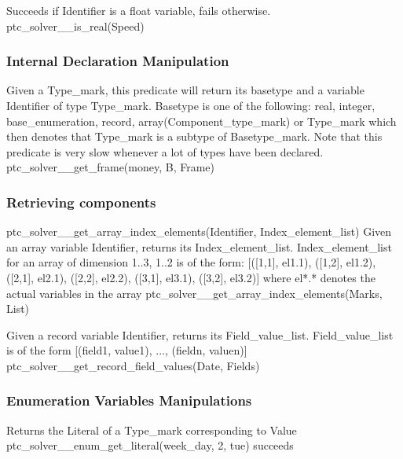 \documentclass{article}
\begin{document}
    {Succeeds if Identifier is a float variable, fails otherwise.}
    {ptc\_solver\_\_is\_real(Speed)}
    {}

\subsubsection{Internal Declaration Manipulation}

\hspace{\parindent}
{Given a Type\_mark, this predicate will return its basetype and a
variable Identifier of type Type\_mark. Basetype is one of the following: real,
integer, base\_enumeration, record,
array(Component\_type\_mark) or Type\_mark which then denotes that Type\_mark is
a subtype of Basetype\_mark. Note that this predicate is very slow whenever a lot
of types have been declared.}
{ptc\_solver\_\_get\_frame(money, B, Frame)}
{}

\subsubsection{Retrieving components}

\hspace{\parindent}\pro
{ptc\_solver\_\_get\_array\_index\_elements(Identifier, Index\_element\_list)}
    {Given an array variable Identifier, returns its Index\_element\_list.
Index\_element\_list for an array of dimension 1..3, 1..2 is of the form:
 [([1,1], el1.1), ([1,2], el1.2), ([2,1], el2.1), ([2,2], el2.2), ([3,1], el3.1),
([3,2],
 el3.2)] where el*.* denotes the actual variables in the array}
        {ptc\_solver\_\_get\_array\_index\_elements(Marks, List)}
        {}

    {Given a record variable Identifier, returns its Field\_value\_list.
Field\_value\_list is of the form [(field1, value1), ..., (fieldn, valuen)]}
        {ptc\_solver\_\_get\_record\_field\_values(Date, Fields)}
        {}

\subsubsection{Enumeration Variables Manipulations}

\hspace{\parindent}
        {Returns the Literal of a Type\_mark corresponding to Value}
        {ptc\_solver\_\_enum\_get\_literal(week\_day, 2, tue) succeeds}
        {}
\end{document}
